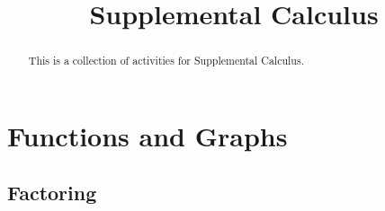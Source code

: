\documentclass{ximera}
\title{Supplemental Calculus}
\begin{document}
\begin{abstract}
This is a collection of activities for Supplemental Calculus.
\end{abstract}

\maketitle



%
\section{Functions and Graphs}
%
%

%
%
\subsection{Factoring}



\end{document}
